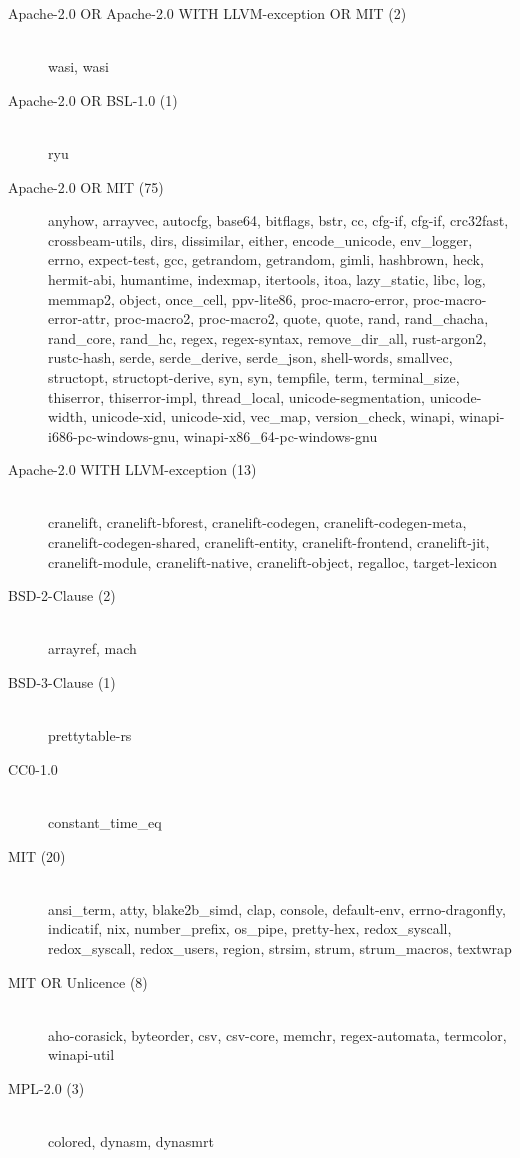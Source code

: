 \begin{description}
    \item[Apache-2.0 OR Apache-2.0 WITH LLVM-exception OR MIT (2)] \hfill \\ wasi, wasi
    \item[Apache-2.0 OR BSL-1.0 (1)] \hfill \\ ryu
    \item[Apache-2.0 OR MIT (75)] anyhow, arrayvec, autocfg, base64, bitflags, bstr, cc,
          cfg-if, cfg-if, crc32fast, crossbeam-utils, dirs, dissimilar, either, encode\_unicode,
          env\_logger,
          errno, expect-test, gcc, getrandom, getrandom, gimli, hashbrown, heck, hermit-abi,
          humantime,
          indexmap, itertools, itoa, lazy\_static, libc, log, memmap2, object, once\_cell,
          ppv-lite86,
          proc-macro-error, proc-macro-error-attr, proc-macro2, proc-macro2, quote, quote, rand,
          rand\_chacha, rand\_core, rand\_hc, regex, regex-syntax, remove\_dir\_all, rust-argon2,
          rustc-hash,
          serde, serde\_derive, serde\_json, shell-words, smallvec, structopt, structopt-derive,
          syn, syn,
          tempfile, term, terminal\_size, thiserror, thiserror-impl, thread\_local,
          unicode-segmentation,
          unicode-width, unicode-xid, unicode-xid, vec\_map, version\_check, winapi,
          winapi-i686-pc-windows-gnu, winapi-x86\_64-pc-windows-gnu
    \item[Apache-2.0 WITH LLVM-exception (13)] \hfill \\ cranelift, cranelift-bforest,
          cranelift-codegen,
          cranelift-codegen-meta, cranelift-codegen-shared, cranelift-entity, cranelift-frontend,
          cranelift-jit, cranelift-module, cranelift-native, cranelift-object, regalloc,
          target-lexicon
    \item[BSD-2-Clause (2)] \hfill \\ arrayref, mach
    \item[BSD-3-Clause (1)] \hfill \\ prettytable-rs
    \item[CC0-1.0] \hfill \\ constant\_time\_eq
    \item[MIT (20)] \hfill \\ ansi\_term, atty, blake2b\_simd, clap, console, default-env,
          errno-dragonfly, indicatif, nix, number\_prefix, os\_pipe, pretty-hex, redox\_syscall,
          redox\_syscall, redox\_users, region, strsim, strum, strum\_macros, textwrap
    \item[MIT OR Unlicence (8)] \hfill \\ aho-corasick, byteorder, csv, csv-core, memchr,
          regex-automata, termcolor, winapi-util
    \item[MPL-2.0 (3)] \hfill \\ colored, dynasm, dynasmrt
\end{description}